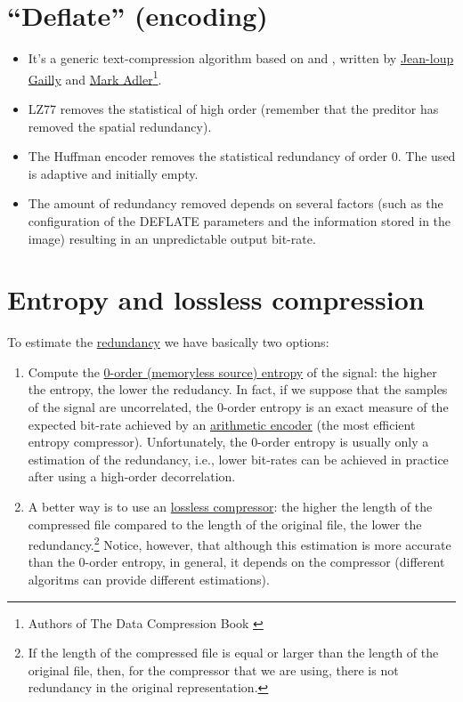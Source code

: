 \section{``Deflate'' (encoding)}
\begin{itemize}
\item It's a generic text-compression algorithm based on
   and ,
  written by
  \href{https://en.wikipedia.org/wiki/Jean-loup_Gailly}{Jean-loup
    Gailly} and \href{https://en.wikipedia.org/wiki/Mark_Adler}{Mark
    Adler}\footnote{Authors of The Data Compression Book
    \cite{nelson96datacompression}}.
\item LZ77 removes the statistical  of
  high order (remember that the preditor has removed the spatial
  redundancy).
\item The Huffman encoder removes the statistical redundancy of order
  0. The  used is
  adaptive and initially empty.
\item The amount of redundancy removed depends on several factors
  (such as the configuration of the DEFLATE parameters and the
  information stored in the image) resulting in an unpredictable
  output bit-rate.
\end{itemize}

\section{Entropy and lossless compression}
To estimate the
\href{https://en.wikipedia.org/wiki/Redundancy_(information_theory)}{redundancy}
we have basically two options:
\begin{enumerate}
\item Compute the
  \href{https://en.wikipedia.org/wiki/Entropy_(information_theory)}{0-order
    (memoryless source) entropy} of the signal: the higher the
  entropy, the lower the redudancy. In fact, if we suppose that the
  samples of the signal are uncorrelated, the 0-order entropy is an
  exact measure of the expected bit-rate achieved by an
  \href{https://en.wikipedia.org/wiki/Arithmetic_coding}{arithmetic
    encoder} (the most efficient entropy compressor). Unfortunately,
  the 0-order entropy is usually only a estimation of the redundancy,
  i.e., lower bit-rates can be achieved in practice after using a high-order
  decorrelation.
\item A better way is to use an
  \href{https://en.wikipedia.org/wiki/Data_compression}{lossless
    compressor}: the higher the length of the compressed file compared
  to the length of the original file, the lower the
  redundancy.\footnote{If the length of the compressed file is equal or
  larger than the length of the original file, then, for the compressor
  that we are using, there is not redundancy in the original
  representation.} Notice, however, that although this estimation is
  more accurate than the 0-order entropy, in general, it depends on the
  compressor (different algoritms can provide different
  estimations).
\end{enumerate}

